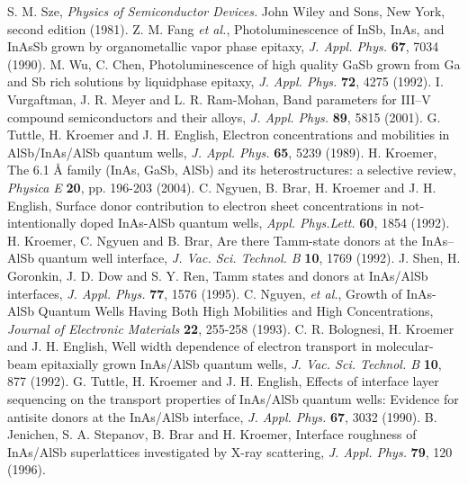 \documentclass[titlepage,a4paper]{book}
\begin{document}
\begin{thebibliography}{99}
S. M. Sze, \textit{Physics of Semiconductor Devices.} John Wiley and Sons, New York, second edition (1981).
Z. M. Fang \textit{et al.}, Photoluminescence of InSb, InAs, and InAsSb grown by organometallic vapor phase epitaxy, \textit{J. Appl. Phys.} \textbf{67}, 7034 (1990).
M. Wu, C. Chen, Photoluminescence of high quality GaSb grown from Ga and Sb rich solutions by liquidphase epitaxy, \textit{J. Appl. Phys.} \textbf{72}, 4275 (1992).
I. Vurgaftman, J. R. Meyer and L. R. Ram-Mohan, Band parameters for III–V compound semiconductors and their alloys, \textit{J. Appl. Phys.} \textbf{89}, 5815 (2001).
G. Tuttle, H. Kroemer and J. H. English, Electron concentrations and mobilities in AlSb/InAs/AlSb quantum wells, \textit{J. Appl. Phys.} \textbf{65}, 5239 (1989).
H. Kroemer, The 6.1 Å family (InAs, GaSb, AlSb) and its heterostructures: a selective review, \textit{Physica E} \textbf{20}, pp. 196-203 (2004). 
C. Ngyuen, B. Brar, H. Kroemer and J. H. English, Surface donor contribution to electron sheet concentrations in not-intentionally doped InAs-AlSb quantum wells, \textit{Appl. Phys.Lett.} \textbf{60}, 1854 (1992).
H. Kroemer, C. Ngyuen and B. Brar, Are there Tamm-state donors at the InAs–AlSb quantum well interface, \textit{J. Vac. Sci. Technol. B} \textbf{10}, 1769 (1992). 
J. Shen, H. Goronkin, J. D. Dow and S. Y. Ren, Tamm states and donors at InAs/AlSb interfaces, \textit{J. Appl. Phys.} \textbf{77}, 1576 (1995).
C. Nguyen, \textit{et al.}, Growth of InAs-AlSb Quantum Wells Having Both High Mobilities and High Concentrations, \textit{Journal of Electronic Materials} \textbf{22}, 255-258 (1993).
C. R. Bolognesi, H. Kroemer and J. H. English, Well width dependence of electron transport in molecular-beam epitaxially grown InAs/AlSb quantum wells, \textit{J. Vac. Sci. Technol. B} \textbf{10}, 877 (1992).
G. Tuttle, H. Kroemer and J. H. English, Effects of interface layer sequencing on the transport properties of InAs/AlSb quantum wells: Evidence for antisite donors at the InAs/AlSb interface, \textit{J. Appl. Phys.} \textbf{67}, 3032 (1990).
B. Jenichen, S. A. Stepanov, B. Brar and H. Kroemer, Interface roughness of InAs/AlSb superlattices investigated by X-ray scattering, \textit{J. Appl. Phys.} \textbf{79}, 120 (1996).

\end{thebibliography}
\end{document}

